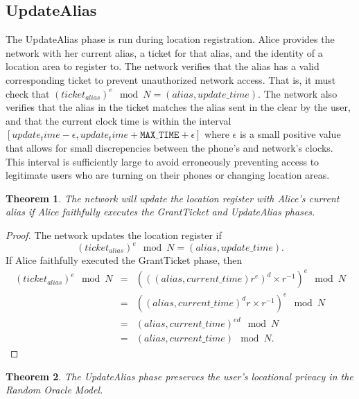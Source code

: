 \documentclass[11pt]{article}
\newtheorem{theorem}{Theorem}
\begin{document}
\subsection{UpdateAlias}
The UpdateAlias phase is run during location registration. Alice provides the network with her current alias, a ticket for that alias, and the identity of a location area to register to. The network verifies that the alias has a valid corresponding ticket to prevent unauthorized network access. That is, it must check that $(ticket_{alias})^e \mod N = (alias, update\_time)$. The network also verifies that the alias in the ticket matches the alias sent in the clear by the user, and that the current clock time is within the interval $[update_time - \epsilon, update_time + \texttt{MAX_TIME} + \epsilon]$ where $\epsilon$ is a small positive value that allows for small discrepencies between the phone's and network's clocks. This interval is sufficiently large to avoid erroneously preventing access to legitimate users who are turning on their phones or changing location areas.

\begin{theorem}
	The network will update the location register with Alice's current alias if Alice faithfully executes the \emph{GrantTicket} and \emph{UpdateAlias} phases.
\end{theorem}
\begin{proof}
The network updates the location register if 
\begin{equation*}
	(ticket_{alias})^e \mod N = (alias, update\_time).
\end{equation*}
If Alice faithfully executed the GrantTicket phase, then
\begin{eqnarray*}
	(ticket_{alias})^e \mod N & = & (((alias,current\_time)r^e)^d \times r^{-1})^e \mod N \\
	& = & ((alias,current\_time)^dr \times r^{-1})^e \mod N \\
	& = & (alias,current\_time)^{ed} \mod N \\
	& = & (alias, current\_time) \mod N.
\end{eqnarray*}
\end{proof}

\begin{theorem}The \emph{UpdateAlias} phase preserves the user's locational privacy in the Random Oracle Model.
\end{theorem}
\end{document}

